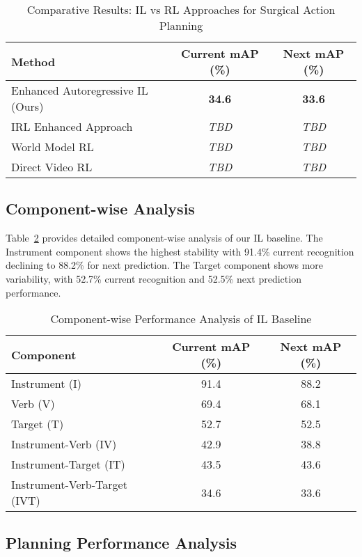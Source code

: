 \documentclass[runningheads]{llncs}
\begin{document}
\begin{table}[h]
\centering
\caption{Comparative Results: IL vs RL Approaches for Surgical Action Planning}
\label{tab:main_results}
\begin{tabular}{lcc}
\toprule
\textbf{Method} & \textbf{Current mAP (\%)} & \textbf{Next mAP (\%)} \\
\midrule
Enhanced Autoregressive IL (Ours) & \textbf{34.6} & \textbf{33.6} \\
\midrule
IRL Enhanced Approach & \textit{TBD} & \textit{TBD} \\
World Model RL & \textit{TBD} & \textit{TBD} \\
Direct Video RL & \textit{TBD} & \textit{TBD} \\
\bottomrule
\end{tabular}
\end{table}

\subsection{Component-wise Analysis}

Table~\ref{tab:component_analysis} provides detailed component-wise analysis of our IL baseline. The Instrument component shows the highest stability with 91.4\% current recognition declining to 88.2\% for next prediction. The Target component shows more variability, with 52.7\% current recognition and 52.5\% next prediction performance.

\begin{table}[h]
\centering
\caption{Component-wise Performance Analysis of IL Baseline}
\label{tab:component_analysis}
\begin{tabular}{lcc}
\toprule
\textbf{Component} & \textbf{Current mAP (\%)} & \textbf{Next mAP (\%)} \\
\midrule
Instrument (I) & 91.4 & 88.2 \\
Verb (V) & 69.4 & 68.1 \\
Target (T) & 52.7 & 52.5 \\
\midrule
Instrument-Verb (IV) & 42.9 & 38.8 \\
Instrument-Target (IT) & 43.5 & 43.6 \\
Instrument-Verb-Target (IVT) & 34.6 & 33.6 \\
\bottomrule
\end{tabular}
\end{table}

\subsection{Planning Performance Analysis}
\end{document}
